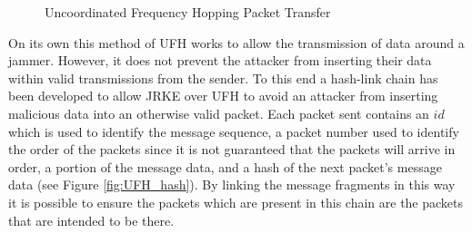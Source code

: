 \documentclass[sigconf]{acmart}
\begin{document}
\begin{figure}[ht]
    
    \caption{Uncoordinated Frequency Hopping Packet Transfer}
    \label{fig:UFH_rand_channels}
\end{figure}

On its own this method of UFH works to allow the transmission of data around a jammer. However, it does not prevent the attacker from inserting their data within valid transmissions from the sender. To this end a hash-link chain has been developed to allow JRKE over UFH to avoid an attacker from inserting malicious data into an otherwise valid packet. Each packet sent contains an $id$ which is used to identify the message sequence, a packet number used to identify the order of the packets since it is not guaranteed that the packets will arrive in order, a portion of the message data, and a hash of the next packet's message data (see Figure \ref{fig:UFH_hash}). By linking the message fragments in this way it is possible to ensure the packets which are present in this chain are the packets that are intended to be there.
\end{document}
